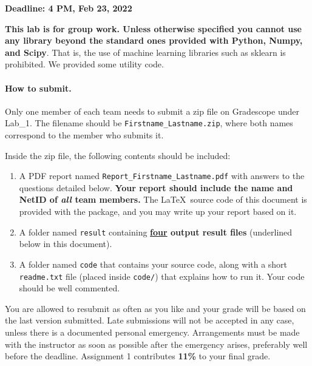 \documentclass[11pt]{report}
\begin{document}
\maketitle

{\bf Deadline: 4 PM, Feb 23, 2022}


{\bf This lab is for group work.
Unless otherwise specified you cannot use any library beyond the standard ones provided with Python, Numpy, and Scipy}.
That is, the use of machine learning libraries such as sklearn is prohibited.
We provided some utility code.



\paragraph{How to submit.}

Only one member of each team needs to submit a zip file on Gradescope under Lab\_1.
The filename should be \verb#Firstname_Lastname.zip#,
where both names correspond to the member who submits it.

Inside the zip file, the following contents should be included:
\begin{enumerate}
	\item  A PDF report named \verb#Report_Firstname_Lastname.pdf# with answers to the questions detailed below.
	{\bf Your report should include the name and NetID of \emph{all} team members.}
	The \LaTeX\ source code of this document is provided with the package, and you may write up your report based on it.
	\item A folder named \verb#result# containing {\bf \underline{four} output result files} (underlined below in this document).
	\item A folder named \verb#code# that contains your source code, along with a short \verb#readme.txt# file (placed inside \verb#code/#) that explains how to run it.
		Your code should be well commented.
\end{enumerate}



You are allowed to resubmit as often as you like and your grade will be based on the last version submitted.
Late submissions will not be accepted in any case, 
unless there is a documented personal emergency.  
Arrangements must be made with the instructor as soon as possible after the emergency arises,
preferably well before the deadline.
Assignment 1 contributes {\bf 11\%} to your final grade.
\end{document}
